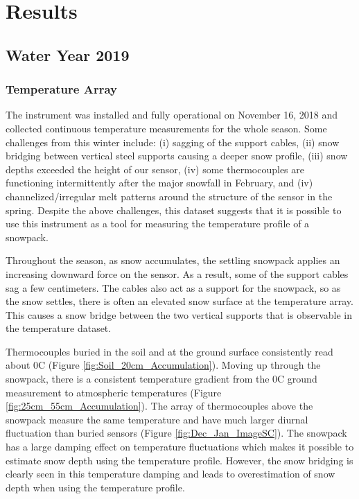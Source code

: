 \chapter{Results}
\section{Water Year 2019} 
\subsection{Temperature Array}
The instrument was installed and fully operational on November 16, 2018 and collected continuous temperature measurements for the whole season. Some challenges from this winter include: (i) sagging of the support cables, (ii) snow bridging between vertical steel supports causing a deeper snow profile, (iii) snow depths exceeded the height of our sensor, (iv) some thermocouples are functioning intermittently after the major snowfall in February, and (iv) channelized/irregular melt patterns around the structure of the sensor in the spring. Despite the above challenges, this dataset suggests that it is possible to use this instrument as a tool for measuring the temperature profile of a snowpack. 

Throughout the season, as snow accumulates, the settling snowpack applies an increasing downward force on the sensor. As a result, some of the support cables sag a few centimeters. The cables also act as a support for the snowpack, so as the snow settles, there is often an elevated snow surface at the temperature array. This causes a snow bridge between the two vertical supports that is observable in the temperature dataset.   

Thermocouples buried in the soil and at the ground surface consistently read about 0\textdegree C (Figure \ref{fig:Soil_20cm_Accumulation}). Moving up through the snowpack, there is a consistent temperature gradient from the 0\textdegree C ground measurement to atmospheric temperatures (Figure \ref{fig:25cm_55cm_Accumulation}). The array of thermocouples above the snowpack measure the same temperature and have much larger diurnal fluctuation than buried sensors (Figure \ref{fig:Dec_Jan_ImageSC}). The snowpack has a large damping effect on temperature fluctuations which makes it possible to estimate snow depth using the temperature profile. However, the snow bridging is clearly seen in this temperature damping and leads to overestimation of snow depth when using the temperature profile. 


